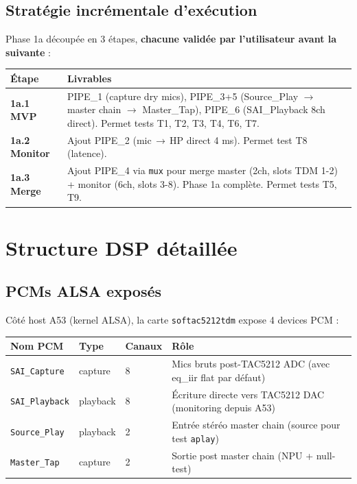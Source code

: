 \documentclass[11pt,a4paper]{article}
\begin{document}
\subsection{Stratégie incrémentale d'exécution}
Phase 1a découpée en 3 étapes, \textbf{chacune validée par l'utilisateur avant la suivante} :
\begin{center}
\begin{tabularx}{\textwidth}{lX}
\toprule
\textbf{Étape} & \textbf{Livrables} \\
\midrule
\textbf{1a.1 MVP} & PIPE\_1 (capture dry mics), PIPE\_3+5 (Source\_Play $\rightarrow$ master chain $\rightarrow$ Master\_Tap), PIPE\_6 (SAI\_Playback 8ch direct). Permet tests T1, T2, T3, T4, T6, T7. \\
\textbf{1a.2 Monitor} & Ajout PIPE\_2 (mic\,$\rightarrow$\,HP direct 4 ms). Permet test T8 (latence). \\
\textbf{1a.3 Merge} & Ajout PIPE\_4 via \texttt{mux} pour merge master (2ch, slots TDM 1-2) + monitor (6ch, slots 3-8). Phase 1a complète. Permet tests T5, T9. \\
\bottomrule
\end{tabularx}
\end{center}

\clearpage
\section{Structure DSP détaillée}

\subsection{PCMs ALSA exposés}
Côté host A53 (kernel ALSA), la carte \texttt{softac5212tdm} expose 4 devices PCM :

\begin{center}
\begin{tabularx}{\textwidth}{lllX}
\toprule
\textbf{Nom PCM} & \textbf{Type} & \textbf{Canaux} & \textbf{Rôle} \\
\midrule
\texttt{SAI\_Capture} & capture & 8 & Mics bruts post-TAC5212 ADC (avec eq\_iir flat par défaut) \\
\texttt{SAI\_Playback} & playback & 8 & Écriture directe vers TAC5212 DAC (monitoring depuis A53) \\
\texttt{Source\_Play} & playback & 2 & Entrée stéréo master chain (source pour test \texttt{aplay}) \\
\texttt{Master\_Tap} & capture & 2 & Sortie post master chain (NPU + null-test) \\
\bottomrule
\end{tabularx}
\end{center}
\end{document}
